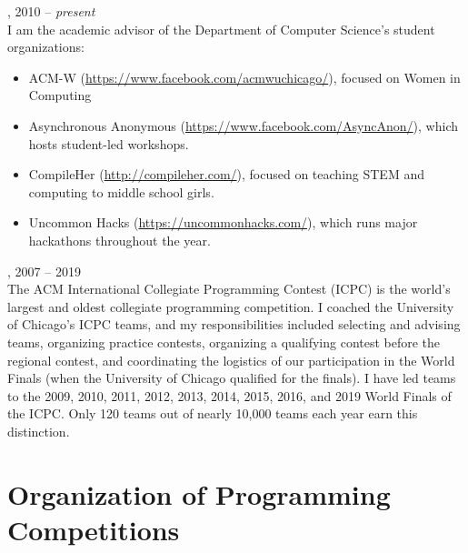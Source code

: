 \documentclass{resume}
\begin{document}
\begin{category}{}
, 2010 -- \emph{present}\\
I am the academic advisor of the Department of Computer Science's student organizations:
\begin{itemize}
\item ACM-W (\url{https://www.facebook.com/acmwuchicago/}), focused on Women in Computing
\item Asynchronous Anonymous (\url{https://www.facebook.com/AsyncAnon/}), which hosts student-led workshops.
\item CompileHer (\url{http://compileher.com/}), focused on teaching STEM and computing to middle school girls.
\item Uncommon Hacks (\url{https://uncommonhacks.com/}), which runs major hackathons throughout the year.
\end{itemize}
, 2007 -- 2019\\
The ACM International Collegiate Programming Contest (ICPC) is the world's largest and oldest collegiate programming competition. I coached the University of Chicago's ICPC teams, and my responsibilities included selecting and advising teams, organizing practice contests, organizing a qualifying contest before the regional contest, and coordinating the logistics of our participation in the World Finals (when the University of Chicago qualified for the finals). I have led teams to the 2009, 2010, 2011, 2012, 2013, 2014, 2015, 2016, and 2019 World Finals of the ICPC. Only 120 teams out of nearly 10,000 teams each year earn this distinction.
\end{category}


\section*{\hspace{-1cm}Organization of Programming Competitions}
\end{document}
